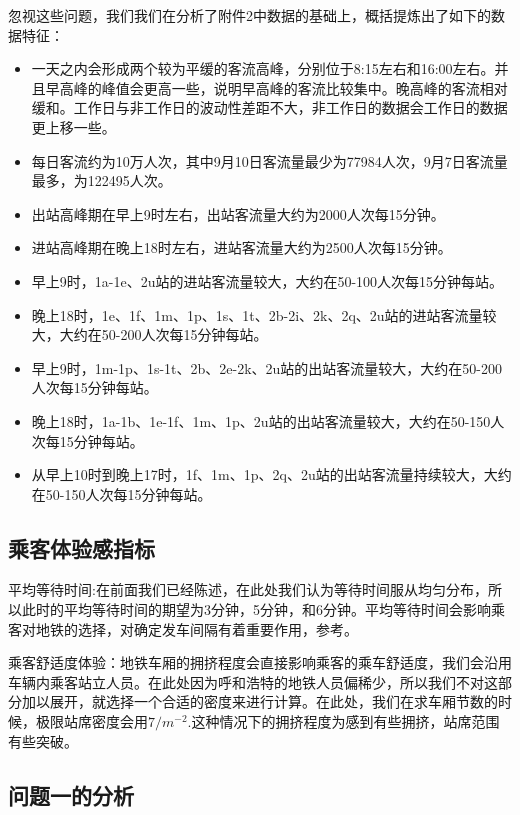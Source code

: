 \documentclass[12pt,a4paper]{mcmthesis}
\begin{document}
    忽视这些问题，我们我们在分析了附件2中数据的基础上，概括提炼出了如下的数据特征：

    \begin{itemize}
        \item 一天之内会形成两个较为平缓的客流高峰，分别位于8:15左右和16:00左右。并且早高峰的峰值会更高一些，说明早高峰的客流比较集中。晚高峰的客流相对缓和。工作日与非工作日的波动性差距不大，非工作日的数据会工作日的数据更上移一些。
        \item 每日客流约为10万人次，其中9月10日客流量最少为77984人次，9月7日客流量最多，为122495人次。
        \item 出站高峰期在早上9时左右，出站客流量大约为2000人次每15分钟。
        \item 进站高峰期在晚上18时左右，进站客流量大约为2500人次每15分钟。
        \item 早上9时，1a-1e、2u站的进站客流量较大，大约在50-100人次每15分钟每站。
        \item 晚上18时，1e、1f、1m、1p、1s、1t、2b-2i、2k、2q、2u站的进站客流量较大，大约在50-200人次每15分钟每站。
        \item 早上9时，1m-1p、1s-1t、2b、2e-2k、2u站的出站客流量较大，大约在50-200人次每15分钟每站。
        \item 晚上18时，1a-1b、1e-1f、1m、1p、2u站的出站客流量较大，大约在50-150人次每15分钟每站。
        \item 从早上10时到晚上17时，1f、1m、1p、2q、2u站的出站客流量持续较大，大约在50-150人次每15分钟每站。
    \end{itemize}

    \subsection{乘客体验感指标}
    平均等待时间:在前面我们已经陈述，在此处我们认为等待时间服从均匀分布，所以此时的平均等待时间的期望为3分钟，5分钟，和6分钟。平均等待时间会影响乘客对地铁的选择，对确定发车间隔有着重要作用，参考\cite{地铁客流}。

    乘客舒适度体验：地铁车厢的拥挤程度会直接影响乘客的乘车舒适度，我们会沿用车辆内乘客站立人员。在此处因为呼和浩特的地铁人员偏稀少，所以我们不对这部分加以展开，就选择一个合适的密度来进行计算。在此处，我们在求车厢节数的时候，极限站席密度会用$7/m^{-2}$.这种情况下的拥挤程度为感到有些拥挤，站席范围有些突破。

    \subsection{问题一的分析}
\end{document}
